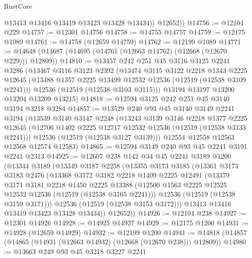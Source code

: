 \begin{lexlean}{RustCore}
\begin{coremodule}
            @13413
            @13416
            @13419
            @13423
            @13428
            @13434))
        @12652))
@14756 := @12104 @229
@14757 := @12301 @14756
@14758 := @14755 @14757
@14759 := @12175 @1089
@14761 := @14758 (@12659 @14759)
@14762 := @12199 @1089
@14771 := @14648 (@14687 (@14695 (@14761 (@12663 @14762) (@12668 (@12670 @229))) @12809))
@14810 := @13457
    @242
    @251
    @45
    @3116
    @3125
    @2241
    @3286
    (@13467
      @3116
      @3123
      @2392
      (@13474
        @3115
        @3122
        @2218
        @1343
        @2225
        @12645
        (@13488 @1357 @2225 @13499 @12532 @12536 (@12519 (@12538 @3109 @2241)))
        @12536
        (@12519 (@12538 @3103 @3115)))
      @13194
      @13197
      @13200
      @13204
      @13209
      @13215)
@14818 := @12594 @3125 @242 @251 @45 @3140 @3194 @3218 @3284
@14857 := @13529
    @240
    @93
    @45
    @3140
    @3149
    @2241
    @3194
    (@13539
      @3140
      @3147
      @2248
      (@13243
        @3139
        @3146
        @2218
        @1377
        @2225
        @12645
        (@12706 @1402 @2225 @12717 @12532 @12536 (@12519 (@12538 @3133 @2241)))
        @12536
        (@12519 (@12538 @3127 @3139)))
      @12554
      @12558
      @12563
      @12568
      @12574
      @12583)
@14865 := @12594 @3149 @240 @93 @45 @2241 @3191 @2241 @2313
@14925 := @12607
    @238
    @142
    @34
    @45
    @2241
    @3189
    @1200
    (@13344
      @3189
      (@13349
        @3187
        @2258
        (@13355
          @3173
          @3185
          (@13361
            @3173
            @3183
            @2476
            (@13368
              @3172
              @3182
              @2218
              @1409
              @2225
              @12491
              (@13379
                @3171
                @3181
                @2218
                @1450
                @2225
                @13388
                (@12500 @1563 @2225 @12525 @12532 @12536 (@12519 (@12538 @3165 @2241)))
                @12536
                (@12519 (@12538 @3159 @3171)))
              @12536
              (@12519 (@12538 @3153 @3172)))
            @13413
            @13416
            @13419
            @13423
            @13428
            @13434))
        @12652))
@14926 := @12104 @238
@14927 := @12301 @14926
@14928 := @14925 @14927
@14929 := @12175 @1200
@14931 := @14928 (@12659 @14929)
@14932 := @12199 @1200
@14941 := @14818 (@14857 (@14865 (@14931 (@12663 @14932) (@12668 (@12670 @238))) @12809))
@14980 := @13663
    @249
    @93
    @45
    @3218
    @3227
    @2241

\end{coremodule}
\end{lexlean}
